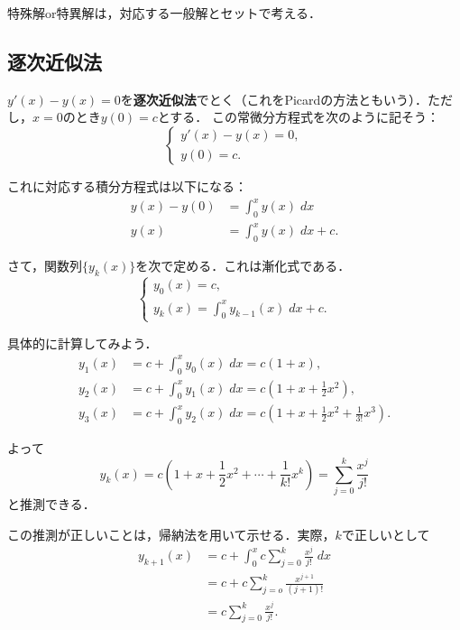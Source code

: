 \begin{remark}
    特殊解or特異解は，対応する一般解とセットで考える．
\end{remark}

\subsection{逐次近似法}
\begin{example}
    $y'(x)-y(x)=0$を\textbf{逐次近似法}でとく（これをPicardの方法ともいう）．ただし，$x=0$のとき$y(0)=c$とする．
    この常微分方程式を次のように記そう：
    \begin{equation}
        \begin{cases}
            y'(x)-y(x)=0, \\
            y(0)=c.
        \end{cases}
    \end{equation}

    これに対応する積分方程式は以下になる：
    \begin{align*}
        y(x)-y(0) &= \int_0^x y(x) \; dx \\
        y(x) &= \int_0^x y(x) \; dx + c.
    \end{align*}
    
    さて，関数列$\{y_k(x)\}$を次で定める．これは漸化式である．
    \begin{equation}
        \begin{cases}
            y_0(x) = c, \\
            y_k(x) = \int_{0}^{x} y_{k-1}(x) \; dx + c.
        \end{cases}
    \end{equation}

    具体的に計算してみよう．
    \begin{align*}
        y_1(x) &= c + \int_{0}^{x} y_0(x) \; dx = c(1+x), \\
        y_2(x) &= c + \int_{0}^{x} y_1(x) \; dx = c(1+x+\frac{1}{2}x^2), \\
        y_3(x) &= c + \int_{0}^{x} y_2(x) \; dx = c(1+x+\frac{1}{2}x^2+\frac{1}{3!}x^3).
    \end{align*}

    よって
    \begin{equation}
        y_k(x) = c(1+x+\frac{1}{2}x^2+\cdots+\frac{1}{k!}x^k) = \sum_{j=0}^{k} \frac{x^j}{j!}
    \end{equation}
    と推測できる．
\end{example}

\begin{note*}[この推測は正しいの？]
    この推測が正しいことは，帰納法を用いて示せる．実際，$k$で正しいとして
    \begin{align*}
        y_{k+1}(x) &= c + \int_{0}^{x} c\sum_{j=0}^{k} \frac{x^j}{j!} \; dx \\
        &= c + c \sum_{j=o}^{k} \frac{x^{j+1}}{(j+1)!} \\
        &= c \sum_{j=0}^{k} \frac{x^j}{j!}.
    \end{align*}
\end{note*}

